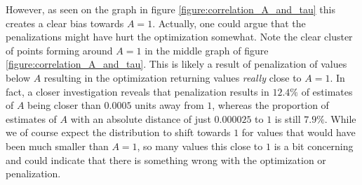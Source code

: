 However, as seen on the graph in figure \ref{figure:correlation_A_and_tau} this creates a clear bias towards $A = 1$. Actually, one could argue that the penalizations might have hurt the optimization somewhat. Note the clear cluster of points forming around $A = 1$ in the middle graph of figure \ref{figure:correlation_A_and_tau}. This is likely a result of penalization of values below $A$ resulting in the optimization returning values \textit{really} close to $A = 1$. In fact, a closer investigation reveals that penalization results in $12.4\%$ of estimates of $A$ being closer than $0.0005$ units away from $1$, whereas the proportion of estimates of $A$ with an absolute distance of just $0.000025$ to $1$ is still $7.9\%$. While we of course expect the distribution to shift towards $1$ for values that would have been much smaller than $A = 1$, so many values this close to $1$ is a bit concerning and could indicate that there is something wrong with the optimization or penalization. 

